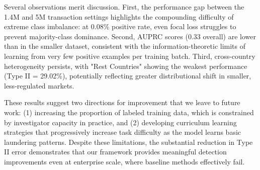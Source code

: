 Several observations merit discussion. First, the performance gap between the 1.4M and 5M transaction settings highlights the compounding difficulty of extreme class imbalance: at 0.08\% positive rate, even focal loss struggles to prevent majority-class dominance. Second, AUPRC scores (0.33 overall) are lower than in the smaller dataset, consistent with the information-theoretic limits of learning from very few positive examples per training batch. Third, cross-country heterogeneity persists, with "Rest Countries" showing the weakest performance (Type II = 29.02\%), potentially reflecting greater distributional shift in smaller, less-regulated markets.

 
These results suggest two directions for improvement that we leave to future work: (1) increasing the proportion of labeled training data, which is constrained by investigator capacity in practice, and (2) developing curriculum learning strategies that progressively increase task difficulty as the model learns basic laundering patterns. Despite these limitations, the substantial reduction in Type II error demonstrates that our framework provides meaningful detection improvements even at enterprise scale, where baseline methods effectively fail.

\begin{table}[ht!]
\centering
\caption{Performance Comparison Between Our Method and the Baseline Method (GNN with Focal Loss)}
\small
{}
\label{scalability_analysis}
\end{table}




